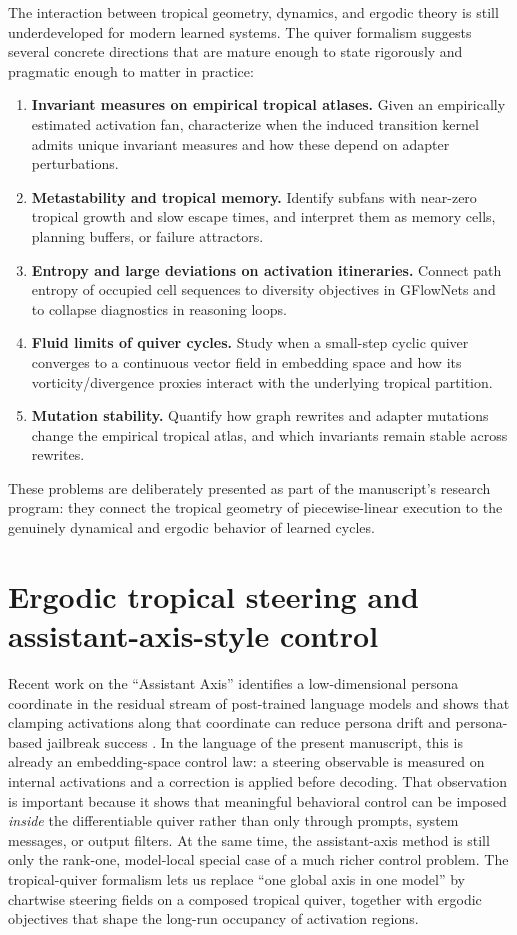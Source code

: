 \documentclass[11pt]{article}
\theoremstyle{definition}
\theoremstyle{plain}
\theoremstyle{remark}
\begin{document}
The interaction between tropical geometry, dynamics, and ergodic theory is still underdeveloped for modern learned systems.
The quiver formalism suggests several concrete directions that are mature enough to state rigorously and pragmatic enough to matter in practice:
\begin{enumerate}[leftmargin=2em]
\item \textbf{Invariant measures on empirical tropical atlases.} Given an empirically estimated activation fan, characterize when the induced transition kernel admits unique invariant measures and how these depend on adapter perturbations.
\item \textbf{Metastability and tropical memory.} Identify subfans with near-zero tropical growth and slow escape times, and interpret them as memory cells, planning buffers, or failure attractors.
\item \textbf{Entropy and large deviations on activation itineraries.} Connect path entropy of occupied cell sequences to diversity objectives in GFlowNets and to collapse diagnostics in reasoning loops.
\item \textbf{Fluid limits of quiver cycles.} Study when a small-step cyclic quiver converges to a continuous vector field in embedding space and how its vorticity/divergence proxies interact with the underlying tropical partition.
\item \textbf{Mutation stability.} Quantify how graph rewrites and adapter mutations change the empirical tropical atlas, and which invariants remain stable across rewrites.
\end{enumerate}
These problems are deliberately presented as part of the manuscript's research program:
they connect the tropical geometry of piecewise-linear execution to the genuinely dynamical and ergodic behavior of learned cycles.

\newpage

\section{Ergodic tropical steering and assistant-axis-style control}
\label{sec:ergodic-steering}

Recent work on the ``Assistant Axis'' identifies a low-dimensional persona coordinate in the residual stream of post-trained language models and shows that clamping activations along that coordinate can reduce persona drift and persona-based jailbreak success \cite{AnthropicAssistantAxis2026,LuGallagherMichalaFishLindsey2026}.
In the language of the present manuscript, this is already an embedding-space control law:
a steering observable is measured on internal activations and a correction is applied before decoding.
That observation is important because it shows that meaningful behavioral control can be imposed \emph{inside} the differentiable quiver rather than only through prompts, system messages, or output filters.
At the same time, the assistant-axis method is still only the rank-one, model-local special case of a much richer control problem.
The tropical-quiver formalism lets us replace ``one global axis in one model'' by chartwise steering fields on a composed tropical quiver, together with ergodic objectives that shape the long-run occupancy of activation regions.
\end{document}
